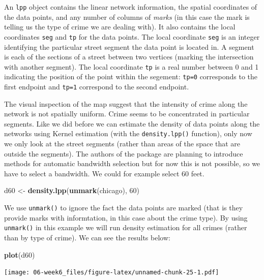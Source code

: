 \documentclass[]{book}
\newenvironment{Shaded}{\begin{snugshade}}{\end{snugshade}}
\newcommand{\DecValTok}[1]{\textcolor[rgb]{0.00,0.00,0.81}{#1}}
\newcommand{\KeywordTok}[1]{\textcolor[rgb]{0.13,0.29,0.53}{\textbf{#1}}}
\newcommand{\NormalTok}[1]{#1}
\newcommand{\StringTok}[1]{\textcolor[rgb]{0.31,0.60,0.02}{#1}}
\begin{document}
An \texttt{lpp} object contains the linear network information, the spatial coordinates of the data points, and any number of columns of \emph{marks} (in this case the mark is telling us the type of crime we are dealing with). It also contains the local coordinates \texttt{seg} and \texttt{tp} for the data points. The local coordinate \texttt{seg} is an integer identifying the particular street segment the data point is located in. A segment is each of the sections of a street between two vertices (marking the intersection with another segment). The local coordinate \texttt{tp} is a real number between 0 and 1 indicating the position of the point within the segement: \texttt{tp=0} corresponds to the first endpoint and \texttt{tp=1} correspond to the second endpoint.

The visual inspection of the map suggest that the intensity of crime along the network is not spatially uniform. Crime seems to be concentrated in particular segments. Like we did before we can estimate the density of data points along the networks using Kernel estimation (with the \texttt{density.lpp()} function), only now we only look at the street segments (rather than areas of the space that are outside the segments). The authors of the package are planning to introduce methods for automatic bandwidth selection but for now this is not possible, so we have to select a bandwidth. We could for example select 60 feet.

\begin{Shaded}
\begin{Highlighting}[]
\NormalTok{d60 <-}\StringTok{ }\KeywordTok{density.lpp}\NormalTok{(}\KeywordTok{unmark}\NormalTok{(chicago), }\DecValTok{60}\NormalTok{)}
\end{Highlighting}
\end{Shaded}

We use \texttt{unmark()} to ignore the fact the data points are marked (that is they provide marks with informtation, in this case about the crime type). By using \texttt{unmark()} in this example we will run density estimation for all crimes (rather than by type of crime). We can see the results below:

\begin{Shaded}
\begin{Highlighting}[]
\KeywordTok{plot}\NormalTok{(d60)}
\end{Highlighting}
\end{Shaded}

\texttt{[image: 06-week6\_files/figure-latex/unnamed-chunk-25-1.pdf]}
\end{document}
